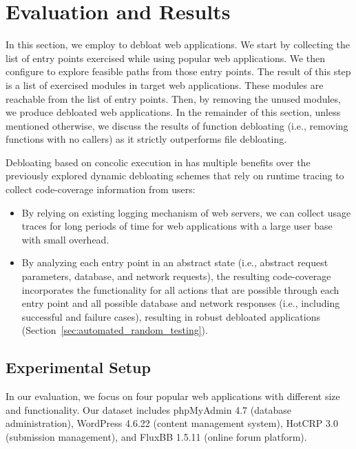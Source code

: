 \section{Evaluation and Results}
\label{sec:results}

In this section, we employ \animatedead{} to debloat web applications. 
We start by collecting the list of entry points exercised while using popular web applications. 
We then configure \animatedead{} to explore feasible paths from those entry points. 
The result of this step is a list of exercised modules in target web applications. 
These modules are reachable from the list of entry points. 
Then, by removing the unused modules, we produce debloated web applications. 
In the remainder of this section, unless mentioned otherwise, we discuss the results of function debloating (i.e., removing functions with no callers) as it strictly outperforms file debloating.

Debloating based on concolic execution in \animatedead{} has multiple benefits over the previously explored dynamic debloating schemes that rely on runtime tracing to collect code-coverage information from users:

\begin{itemize}
    \item By relying on existing logging mechanism of web servers, we can collect usage traces for long periods of time for web applications with a large user base with small overhead.
    \item By analyzing each entry point in an abstract state (i.e., abstract request parameters, database, and network requests), the resulting code-coverage incorporates the functionality for all actions that are possible through each entry point and all possible database and network responses (i.e., including successful and failure cases), resulting in robust debloated applications (Section~\ref{sec:automated_random_testing}). 
\end{itemize}

\subsection{Experimental Setup}

In our evaluation, we focus on four popular web applications with different size and functionality. 
Our dataset includes phpMyAdmin 4.7 (database administration), WordPress 4.6.22 (content management system), HotCRP 3.0 (submission management), and FluxBB 1.5.11 (online forum platform). 

